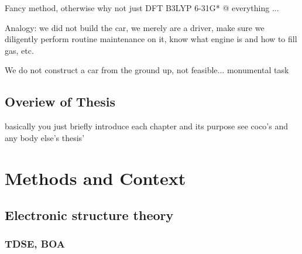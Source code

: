 \documentclass[letterpaper, 12pt, oneside]{report}
\newif\iffinalize
\newif\iffinalize
\begin{document}
    Fancy method, otherwise why not just DFT B3LYP 6-31G* @ everything ...


    Analogy: we did not build the car, we merely are a driver, make sure we diligently perform routine maintenance on it, know what engine is and how to fill gas, etc. 

    We do not construct a car from the ground up, not feasible... monumental task
\newpage
\else \fi

\section{Overiew of Thesis}

basically you just briefly introduce each chapter and its purpose
see coco's and any body else's thesis'




\iffinalize \chapter{Methods and Context}


\section{Electronic structure theory}
    \newpage
    
    \subsection{TDSE, BOA}
\end{document}
